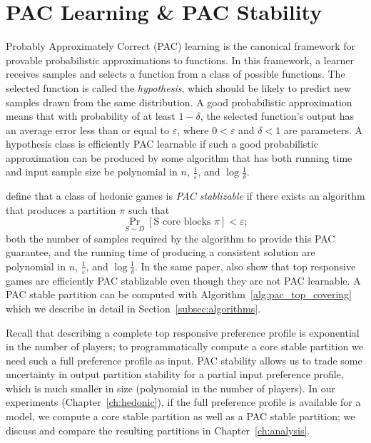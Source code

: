 \section{PAC Learning \& PAC Stability}
\label{sec:pac_learning_pac_stability}
Probably Approximately Correct (PAC) learning is the canonical framework for
provable probabilistic approximations to functions.
In this framework, a learner receives samples and selects a function from a class
of possible functions.
The selected function is called the \textit{hypothesis}, which should be likely
to predict new samples drawn from the same distribution.
A good probabilistic approximation means that with probability of at least
$1 - \delta$, the selected function's output has an average error less than or
equal to $\varepsilon$, where $0 < \varepsilon$ and $\delta < 1$ are parameters.
A hypothesis class is efficiently PAC learnable if such a good probabilistic
approximation can be produced by some algorithm that has both running time and
input sample size be polynomial in $n$, $\frac{1}{\varepsilon}$, and
$\log{\frac{1}{\delta}}$.

 define that a class of hedonic games is \textit{PAC stablizable}
if there exists an algorithm that produces a partition $\pi$ such that
$$\Pr_{S\sim D}[\text{S core blocks } \pi] < \varepsilon;$$
both the number of samples required by the algorithm to provide this PAC guarantee,
and the running time of producing a consistent solution are polynomial in $n$,
$\frac{1}{\varepsilon}$, and $\log{\frac{1}{\delta}}$.
In the same paper,  also show that top responsive games
are efficiently PAC stablizable even though they are not PAC learnable.
A PAC stable partition can be computed with Algorithm~\ref{alg:pac_top_covering}
which we describe in detail in Section~\ref{subsec:algorithms}.

Recall that describing a complete top responsive preference profile is exponential
in the number of players; to programmatically compute a core stable partition
we need such a full preference profile as input.
PAC stability allows us to trade some uncertainty in output partition stability
for a partial input preference profile, which is much smaller in size
(polynomial in the number of players).
In our experiments (Chapter~\ref{ch:hedonic}), if the full preference profile is
available for a model, we compute a core stable partition as well as a PAC stable
partition; we discuss and compare the resulting partitions in Chapter~\ref{ch:analysis}.